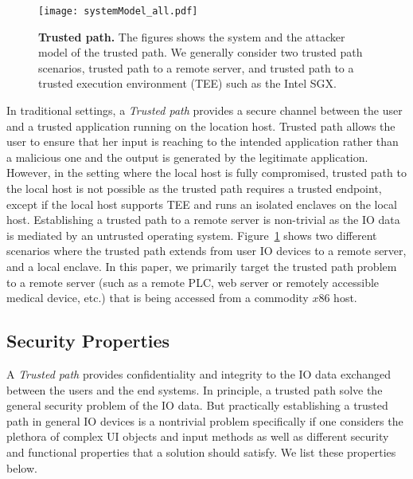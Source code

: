 \begin{figure}[t]
\centering
\texttt{[image: systemModel\_all.pdf]}
\caption{\textbf{Trusted path.} The figures shows the system and the attacker model of the trusted path. We generally consider two trusted path scenarios, \one trusted path to a remote server, and \two trusted path to a trusted execution environment (TEE) such as the Intel SGX.}
\spacesave
\label{fig:trustedPath}
\centering 
\end{figure}

In traditional settings, a \emph{Trusted path} provides a secure channel between the user and a trusted application running on the location host. Trusted path allows the user to ensure that her input is reaching to the intended application rather than a malicious one and the output is generated by the legitimate application. However, in the setting where the local host is fully compromised, trusted path to the local host is not possible as the trusted path requires a trusted endpoint, except if the local host supports TEE and runs an isolated enclaves on the local host. Establishing a trusted path to a remote server is non-trivial as the IO data is mediated by an untrusted operating system. Figure~\ref{fig:trustedPath} shows two different scenarios where the trusted path extends from user IO devices to \one a remote server, and \two a local enclave. %
In this paper, we primarily target the trusted path problem to a remote server (such as a remote PLC, web server or remotely accessible medical device, etc.) that is being accessed from a commodity $x86$ host.

\iffalse
\subsection{Security Properties}

A \emph{Trusted path} provides confidentiality and integrity to the IO data exchanged between the users and the end systems. In principle, a trusted path solve the general security problem of the IO data. But practically establishing a trusted path in general IO devices is a nontrivial problem specifically if one considers the plethora of complex UI objects and input methods as well as different security and functional properties that a solution should satisfy. We list these properties below. 


